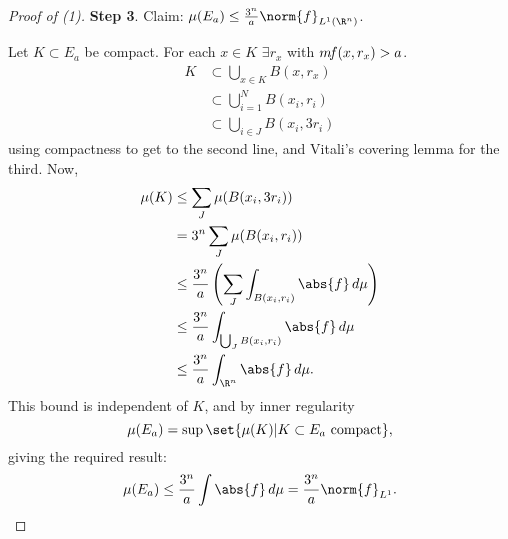 \documentclass[twoside]{article}
\begin{document}
\begin{proof}[Proof of (1)]
    \textbf{Step 3}. Claim: $\mu(E_a) \leq \frac{3^n}{a} \norm{f}_{L^1(\R^n)}$.

    Let $K \subset E_a$ be compact.
    For each $x \in K$ $\exists r_x$ with $m \! f(x, r_x) > a$.
    \begin{align*}
        K &\subset \bigcup_{x \in K} B(x, r_x) \\
          &\subset \bigcup_{i=1}^N B(x_i, r_i) \\
          &\subset \bigcup_{i \in J} B(x_i, 3 r_i)
    \end{align*}
    using compactness to get to the second line, and Vitali's covering lemma for the third. Now,
    \begin{align*}
        \mu(K) &\leq \sum_J \mu(B(x_i, 3 r_i)) \\
               &= 3^n \sum_J \mu(B(x_i, r_i)) \\
               &\leq \frac{3^n}{a} \left(\sum_J \int_{B(x_i, r_i)} \abs{f} \, d\mu\right) \\
               &\leq \frac{3^n}{a} \int_{\bigcup_J B(x_i, r_i)} \abs{f} \, d\mu \\
               &\leq \frac{3^n}{a} \int_{\R^n} \abs{f} \, d\mu.
    \end{align*}
    This bound is independent of $K$, and by inner regularity \begin{equation*}\mu(E_a) = \sup\set{\mu(K) | K \subset E_a \text{ compact}},\end{equation*} giving the required result:
    \begin{equation*}
        \mu(E_a) \leq \frac{3^n}{a} \int \abs{f} \, d\mu = \frac{3^n}{a} \norm{f}_{L^1}.
    \end{equation*}


\end{proof}
\end{document}
